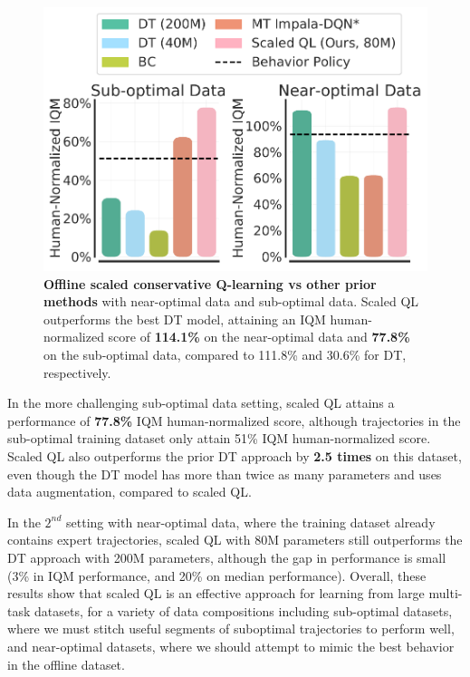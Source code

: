 \begin{figure}
    \vspace{-0.6cm}
    \centering
    \includegraphics[width=0.9\linewidth]{chapters/scaled_ql/combnined_data_results_iqm.pdf}
    \vspace{-0.25cm}
    \caption{\footnotesize{\textbf{Offline scaled conservative Q-learning vs other prior methods} with near-optimal data and sub-optimal data. Scaled QL outperforms the best DT model, attaining an IQM human-normalized score of \textbf{114.1\%} on the near-optimal data and \textbf{77.8\%} on the sub-optimal data, compared to 111.8\% and 30.6\% for DT, respectively.}}
    \label{fig:main_results}
    \vspace{-0.8cm}
\end{figure}

In the more challenging sub-optimal data setting, scaled QL attains a performance of \textbf{77.8\%} IQM human-normalized score, although trajectories in the sub-optimal training dataset only attain 51\% IQM human-normalized score. Scaled QL also outperforms the prior DT approach by \textbf{2.5 times} on this dataset, even though the DT model has more than twice as many parameters and uses data augmentation, compared to scaled QL. 

In the $2^{nd}$ setting with near-optimal data, where the training dataset already contains expert trajectories, scaled QL with 80M parameters still outperforms the DT approach with 200M parameters, although the gap in performance is small (3\% in IQM performance, and 20\% on median performance). 
Overall, these results show that scaled QL is an effective approach for learning from large multi-task datasets, for a variety of data compositions including sub-optimal datasets, where we must stitch useful segments of suboptimal trajectories to perform well, and near-optimal datasets, where we should attempt to mimic the best behavior in the offline dataset. 

